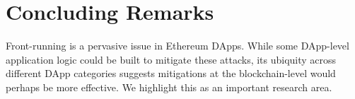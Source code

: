 

%




\section{Concluding Remarks}

Front-running is a pervasive issue in Ethereum DApps. While some DApp-level application logic could be built to mitigate these attacks, its ubiquity across different DApp categories suggests mitigations at the blockchain-level would perhaps be more effective. We highlight this as an important research area. 



